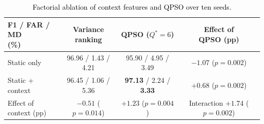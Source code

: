 \documentclass[conference]{IEEEtran}
\begin{document}
\begin{table}[!t]
\centering
\scriptsize
\caption{\textcolor{black}{Factorial ablation of context features and QPSO over ten seeds.}}
\label{tab:centralized_compare}
\setlength{\tabcolsep}{3pt}
\begin{tabular}{lccc}
\hline\toprule
\makecell[l]{F1 / FAR / MD\\(\%)} & \makecell{Variance\\ranking} & \makecell{QPSO\\($Q^{*}{=}6$)} & \makecell{Effect of\\QPSO (pp)} \\
\hline\toprule
Static only & 96.96 / 1.43 / 4.21 & 95.90 / 4.95 / 3.49 & \makecell{$-1.07$\\($p{=}0.002$)} \\
\makecell[l]{Static +\\context} & 96.45 / 1.06 / 5.36 & \textbf{97.13} / 2.24 / \textbf{3.33} & \makecell{$+0.68$\\($p{=}0.002$)} \\
\midrule
\makecell[l]{Effect of\\context (pp)} & \makecell{$-0.51$\\($p{=}0.014$)} & \makecell{$+1.23$\\($p{=}0.004$)} & \makecell{Interaction\\$+1.74$\\($p{=}0.002$)} \\
\hline\toprule
\end{tabular}
\end{table}
\end{document}
